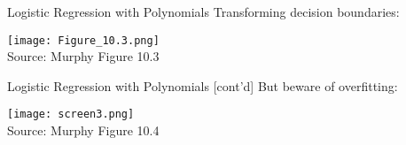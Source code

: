 \documentclass[ignorenonframetext,xcolor=x11names]{beamer}
\begin{document}


\begin{frame}{Logistic Regression with Polynomials}
Transforming decision boundaries:
\begin{center}
\texttt{[image: Figure\_10.3.png]} \\
\scriptsize Source: Murphy Figure 10.3
\end{center}
\end{frame}

\begin{frame}{Logistic Regression with Polynomials \small [cont'd]}
But beware of overfitting:
\begin{center}
\texttt{[image: screen3.png]} \\
\scriptsize Source: Murphy Figure 10.4
\end{center}
\end{frame}
\end{document}
